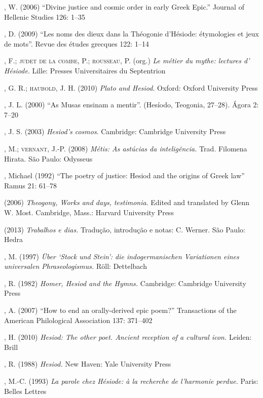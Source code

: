 \begin{bibliohedra} , W. (2006) “Divine justice and cosmic order in
early Greek Epic.” Journal of Hellenic Studies 126: 1--35
  
, D. (2009) “Les noms des dieux dans la Théogonie d’Hésiode:
étymologies et jeux de mots”. Revue des études grecques 122: 1--14
  
, F.; \textsc{judet de la combe}, P.; \textsc{\textsc{rousseau}},
P. (org.) \textit{Le métier du mythe: lectures d’ Hésiode}. Lille: Presses
Universitaires du Septentrion
  
, G. R.; \textsc{haubold}, J. H. (2010) \textit{Plato and
Hesiod}. Oxford: Oxford University Press
  
, J. L. (2000) “As Musas ensinam a mentir''. (Hesíodo, Teogonia,
27--28). Ágora 2: 7--20
  
, J. S. (2003) \textit{Hesiod’s cosmos}. Cambridge: Cambridge
University Press
  
, M.; \textsc{vernant}, J.-P. (2008) \textit{Métis: As astúcias
da inteligência.} Trad. Filomena Hirata. São Paulo: Odysseus
  
  
, Michael (1992) “The poetry of justice: Hesiod and the origins of
Greek law” Ramus 21: 61--78
 
 (2006) \textit{Theogony, Works and days, testimonia}. Edited and
translated by Glenn W. Most. Cambridge, Mass.: Harvard University Press

 (2013) \textit{Trabalhos e dias.} Tradução, introdução e notas:
C. Werner. São Paulo: Hedra
  
, M. (1997) \textit{Über ‘Stock und Stein’: die indogermanischen
Variationen eines universalen Phraseologismus.} Röll: Dettelbach
  
, R. (1982) \textit{Homer, Hesiod and the Hymns.} Cambridge:
Cambridge University Press
  
, A. (2007) “How to end an orally-derived epic poem?” Transactions
of the American Philological Association 137: 371--402
  
, H. (2010) \textit{Hesiod: The other poet. Ancient reception of a
cultural icon.} Leiden: Brill
  
, R. (1988) \textit{Hesiod.} New Haven: Yale University Press
  
, M.-C. (1993) \textit{La parole chez Hésiode: à la recherche de
l’harmonie perdue.} Paris: Belles Lettres
  

\end{bibliohedra}
